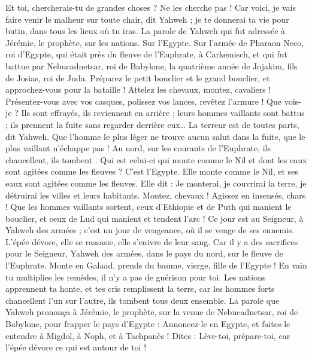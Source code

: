 \begin{multicols}{2}
Et toi, chercherais-tu de grandes choses ? Ne les cherche pas ! Car voici, je vais faire venir le malheur sur toute chair, dit Yahweh ; je te donnerai ta vie pour butin, dans tous les lieux où tu iras.
\VerseOne{}La parole de Yahweh qui fut adressée à Jérémie, le prophète, sur les nations.
Sur l'Egypte. Sur l'armée de Pharaon Neco, roi d'Egypte, qui était près du fleuve de l’Euphrate, à Carkemisch, et qui fut battue par Nebucadnetsar, roi de Babylone, la quatrième année de Jojakim, fils de Josias, roi de Juda.
Préparez le petit bouclier et le grand bouclier, et approchez-vous pour la bataille !
Attelez les chevaux, montez, cavaliers ! Présentez-vous avec vos casques, polissez vos lances, revêtez l’armure !
Que vois-je ? Ils sont effrayés, ils reviennent en arrière ; leurs hommes vaillants sont battus ; ils prennent la fuite sans regarder derrière eux… La terreur est de toutes parts,  dit Yahweh.
Que l'homme le plus léger ne trouve aucun salut dans la fuite, que le plus vaillant n’échappe pas ! Au nord, sur les courants de l'Euphrate, ils chancellent, ils tombent .
Qui est celui-ci qui monte comme le Nil et dont les eaux sont agitées comme les fleuves ?
C'est l'Egypte. Elle monte comme le Nil, et ses eaux sont agitées comme les fleuves. Elle dit : Je monterai, je couvrirai la terre, je détruirai les villes et leurs habitants.
Montez, chevaux ! Agissez en insensés, chars ! Que les hommes vaillants sortent, ceux d’Ethiopie et de Puth qui manient le bouclier, et ceux de  Lud qui manient et tendent l'arc !
Ce jour est au Seigneur, à Yahweh des armées ; c’est un jour de vengeance, où il se venge de ses ennemis. L'épée dévore, elle se rassasie, elle s’enivre de leur sang. Car il y a des sacrifices pour le Seigneur, Yahweh des armées, dans le pays du nord, sur le fleuve de l’Euphrate.
Monte en Galaad, prends du baume, vierge, fille de l'Egypte ! En vain tu multiplies les remèdes, il n'y a pas de guérison pour toi.
Les nations apprennent ta honte, et tes cris remplissent la terre, car les hommes forts chancellent l’un sur l’autre, ils tombent tous deux ensemble.
La parole que Yahweh prononça à Jérémie, le prophète, sur la venue de Nebucadnetsar, roi de Babylone, pour frapper le pays d'Egypte :
Annoncez-le en Egypte, et faites-le entendre à Migdol, à Noph, et à Tachpanès ! Dites : Lève-toi, prépare-toi, car l'épée dévore ce qui est autour de toi !

\end{multicols}
